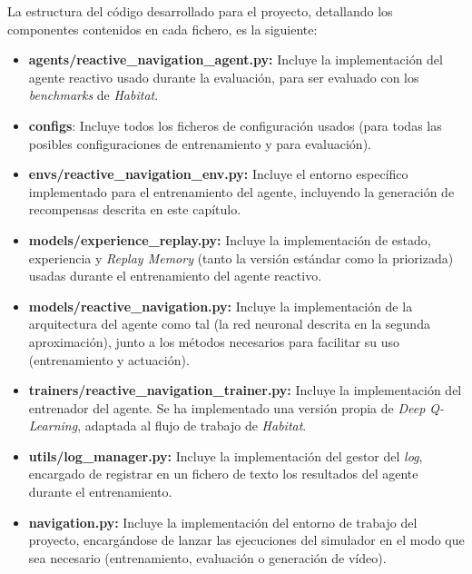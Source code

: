 La estructura del código desarrollado para el proyecto, detallando los componentes contenidos en cada fichero, es la siguiente:
\begin{itemize}
	\item \textbf{agents/reactive{\_}navigation{\_}agent.py:} Incluye la implementación del agente reactivo usado durante la evaluación, para ser evaluado con los \textit{benchmarks} de \textit{Habitat}.
	\item \textbf{configs}: Incluye todos los ficheros de configuración usados (para todas las posibles configuraciones de entrenamiento y para evaluación).
	\item \textbf{envs/reactive{\_}navigation{\_}env.py:} Incluye el entorno específico implementado para el entrenamiento del agente, incluyendo la generación de recompensas descrita en este capítulo.
	\item \textbf{models/experience{\_}replay.py:} Incluye la implementación de estado, experiencia y \textit{Replay Memory} (tanto la versión estándar como la priorizada) usadas durante el entrenamiento del agente reactivo.
	\item \textbf{models/reactive{\_}navigation.py:} Incluye la implementación de la arquitectura del agente como tal (la red neuronal descrita en la segunda aproximación), junto a los métodos necesarios para facilitar su uso (entrenamiento y actuación).
	\item \textbf{trainers/reactive{\_}navigation{\_}trainer.py:} Incluye la implementación del entrenador del agente. Se ha implementado una versión propia de \textit{Deep Q-Learning}, adaptada al flujo de trabajo de \textit{Habitat}.
	\item \textbf{utils/log{\_}manager.py:} Incluye la implementación del gestor del \textit{log}, encargado de registrar en un fichero de texto los resultados del agente durante el entrenamiento.
	\item \textbf{navigation.py:} Incluye la implementación del entorno de trabajo del proyecto, encargándose de lanzar las ejecuciones del simulador en el modo que sea necesario (entrenamiento, evaluación o generación de vídeo).
\end{itemize}